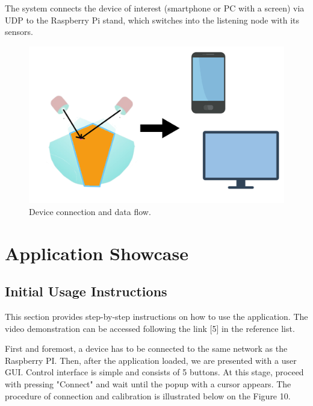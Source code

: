 \documentclass[12pt,a4paper]{article}
\begin{document}
The system connects the device of interest (smartphone or PC with a screen) via UDP to the Raspberry Pi stand, which switches into the listening node with its sensors.

\begin{figure}[!htp]
    \centering
    \includegraphics[scale=0.3]{../IoT Materials/article images/5-Concept-transition-device-relation.png}
    \caption{Device connection and data flow.}
\end{figure}

\section{Application Showcase}
\subsection{Initial Usage Instructions}
This section provides step-by-step instructions on how to use the application. The video demonstration can be accessed following the link [5] in the reference list.

First and foremost, a device has to be connected to the same network as the Raspberry PI. Then, after the application loaded, we are presented with a user GUI. Control interface is simple and consists of 5 buttons. At this stage, proceed with pressing "Connect" and wait until the popup with a cursor appears. The procedure of connection and calibration is illustrated below on the Figure 10.
\end{document}
